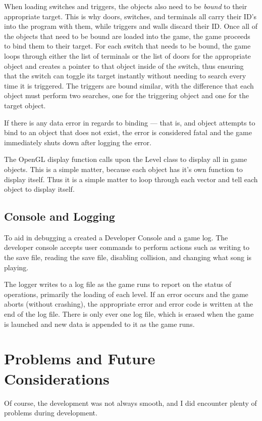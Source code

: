 \documentclass{article}
\begin{document}
When loading switches and triggers, the objects also need to be \emph{bound} to their appropriate target. This is why doors, switches, and terminals all carry their ID's into the program with them, while triggers and walls discard their ID. Once all of the objects that need to be bound are loaded into the game, the game proceeds to bind them to their target. For each switch that needs to be bound, the game loops through either the list of terminals or the list of doors for the appropriate object and creates a pointer to that object inside of the switch, thus ensuring that the switch can toggle its target instantly without needing to search every time it is triggered. The triggers are bound similar, with the difference that each object must perform two searches, one for the triggering object and one for the target object.

If there is any data error in regards to binding --- that is, and object attempts to bind to an object that does not exist, the error is considered fatal and the game immediately shuts down after logging the error.

The OpenGL display function calls upon the Level class to display all in game objects. This is a simple matter, because each object has it's own function to display itself. Thus it is a simple matter to loop through each vector and tell each object to display itself.

\subsection{Console and Logging}

To aid in debugging a created a Developer Console and a game log. The developer console accepts user commands to perform actions such as writing to the save file, reading the save file, disabling collision, and changing what song is playing.

The logger writes to a log file as the game runs to report on the status of operations, primarily the loading of each level. If an error occurs and the game aborts (without crashing), the appropriate error and error code is written at the end of the log file. There is only ever one log file, which is erased when the game is launched and new data is appended to it as the game runs.

\section{Problems and Future Considerations}
Of course, the development was not always smooth, and I did encounter plenty of problems during development.
\end{document}
